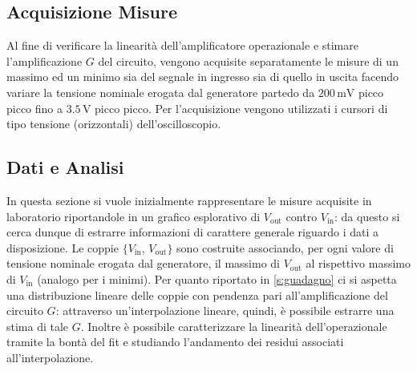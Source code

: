 \documentclass[a4paper,11pt]{article} %
\begin{document}

\subsection{Acquisizione Misure}
Al fine di verificare la linearità dell'amplificatore operazionale e stimare l'amplificazione $G$ del circuito, vengono
acquisite separatamente le misure di un massimo ed un minimo sia del segnale in ingresso sia di quello in uscita facendo
variare la tensione nominale erogata dal generatore partedo da $200\,\si{\mV}$ picco picco fino a $3.5\,\si{\volt}$ picco
picco. Per l'acquisizione vengono utilizzati i cursori di tipo tensione (orizzontali) dell'oscilloscopio. 



\subsection{Dati e Analisi}
In questa sezione si vuole inizialmente rappresentare le misure acquisite in laboratorio riportandole in un grafico
esplorativo di $V_{\text{out}}$ contro $V_{\text{in}}$: da questo si cerca dunque di estrarre informazioni di carattere
generale riguardo i dati a disposizione. Le coppie $\{V_{\text{in}},\,V_{\text{out}}\}$ sono costruite associando, per
ogni valore di tensione nominale erogata dal generatore, il massimo di $V_{\text{out}}$ al rispettivo massimo di
$V_{\text{in}}$ (analogo per i minimi). Per quanto riportato in \autoref{s:guadagno} ci si aspetta una distribuzione
lineare delle coppie con pendenza pari all'amplificazione del circuito $G$: attraverso un'interpolazione lineare,
quindi, è possibile estrarre una stima di tale $G$. Inoltre è possibile caratterizzare la linearità dell'operazionale
tramite la bontà del fit e studiando l'andamento dei residui associati all'interpolazione.


\end{document}
